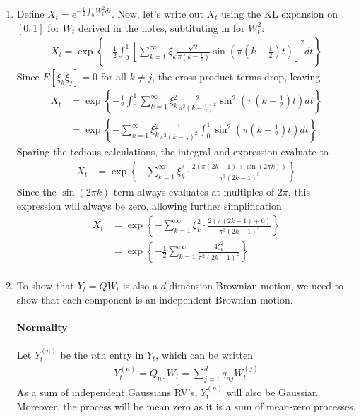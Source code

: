 \documentclass[12pt]{article}
\theoremstyle{plain}
\theoremstyle{definition}
\theoremstyle{remark}
\begin{document}
\begin{enumerate}
\begin{enumerate}
    \end{enumerate}

  \item %
    Define $X_t = e^{-\frac{1}{2}\int^1_0 W_t^2 dt}$. Now, let's write
    out $X_t$ using the KL expansion on $[0,1]$ for $W_t$ derived in the
    notes, subtituting in for $W^2_t$:
    \begin{align*}
      X_t = \exp\left\{
        -\frac{1}{2}\int^1_0
        \left[
        \sum^\infty_{k=1}\xi_k \frac{\sqrt{2}}{\pi\left(k-\frac{1}{2}\right)}
        \sin\left(\pi\left(k-\frac{1}{2}\right)t\right)
        \right]^2 dt
      \right\}
    \end{align*}
    Since $E[\xi_k\xi_j]=0$ for all $k\neq j$, the cross product terms
    drop, leaving
    \begin{align*}
      X_t
      &= \exp\left\{
        -\frac{1}{2}\int^1_0
        \sum^\infty_{k=1}\xi^2_k \frac{2}{\pi^2\left(k-\frac{1}{2}\right)^2}
        \sin^2\left(\pi\left(k-\frac{1}{2}\right)t\right) dt
      \right\}\\
      &= \exp\left\{
        -\sum^\infty_{k=1}
        \xi^2_k \frac{1}{\pi^2\left(k-\frac{1}{2}\right)^2}\int^1_0
        \sin^2\left(\pi\left(k-\frac{1}{2}\right)t\right) dt
      \right\}
    \end{align*}
    Sparing the tedious calculations, the integral and expression
    evaluate to
    \begin{align*}
      X_t
      &= \exp\left\{
        -\sum^\infty_{k=1}\xi_k^2\cdot
        \frac{2(\pi(2k-1) + \sin(2\pi k) )}{\pi^3(2k-1)^3}
      \right\}
    \end{align*}
    Since the $\sin(2\pi k)$ term always evaluates at multiples of
    $2\pi$, this expression will always be zero, allowing further
    simplification
    \begin{align*}
      X_t
      &= \exp\left\{
        -\sum^\infty_{k=1}\xi_k^2\cdot
        \frac{2(\pi(2k-1) + 0 )}{\pi^3(2k-1)^3}
      \right\}\\
      &= \exp\left\{
        -\frac{1}{2}\sum^\infty_{k=1}
        \frac{4\xi_k^2}{\pi^2(2k-1)^2}
      \right\}\\
    \end{align*}

  \item %
    To show that $Y_t = Q W_t$ is also a $d$-dimension Brownian motion,
    we need to show that each component is an independent Brownian
    motion.

    \paragraph{Normality}
    Let $Y^{(n)}_t$ be the $n$th entry in $Y_t$, which can be written
    \begin{align*}
      Y_t^{(n)} = Q_{n\cdot} W_t =
      \sum^d_{j=1} q_{nj} W^{(j)}_t
    \end{align*}
    As a sum of independent Gaussians RV's, $Y^{(n)}_t$ will also be
    Gaussian. Moreover, the process will be mean zero as it is a sum of
    mean-zero processes.


\end{enumerate}
\end{document}

